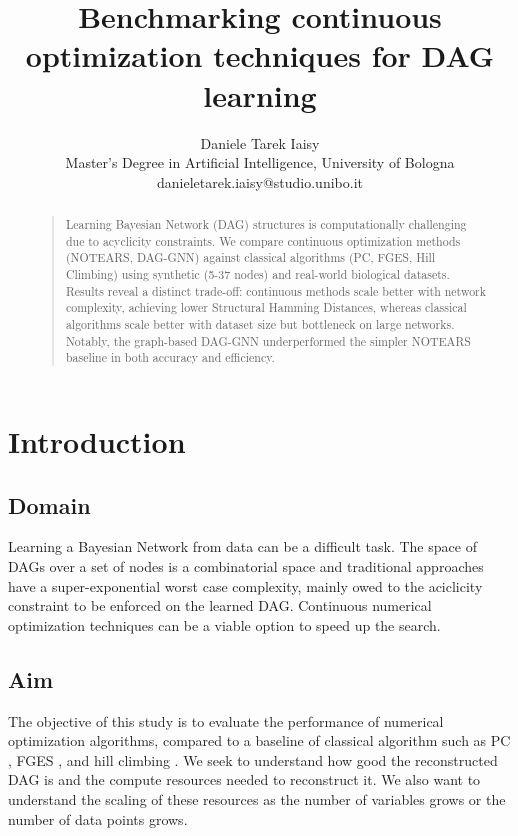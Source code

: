 \documentclass[letterpaper]{article}
\let\savedcite\cite
\let\cite\savedcite
\begin{document}
%
\title{Benchmarking continuous optimization techniques for DAG learning}
\author{Daniele Tarek Iaisy\\
Master's Degree in Artificial Intelligence, University of Bologna\\
danieletarek.iaisy@studio.unibo.it
}
\maketitle


\begin{abstract}
\begin{quote}
Learning Bayesian Network (DAG) structures is computationally challenging due to acyclicity
constraints. We compare continuous optimization methods (NOTEARS, DAG-GNN) against classical
algorithms (PC, FGES, Hill Climbing) using synthetic (5-37 nodes) and real-world biological
datasets. Results reveal a distinct trade-off: continuous methods scale better with network
complexity, achieving lower Structural Hamming Distances, whereas classical algorithms scale
better with dataset size but bottleneck on large networks. Notably, the graph-based DAG-GNN
underperformed the simpler NOTEARS baseline in both accuracy and efficiency.
\end{quote}
\end{abstract}


\section{Introduction}

\subsection{Domain}
Learning a Bayesian Network from data can be a difficult task. The space of DAGs over a set of 
nodes is a combinatorial space and traditional approaches have a super-exponential worst case
complexity, mainly owed to the aciclicity constraint to be enforced on the learned DAG.
Continuous numerical optimization techniques can be a viable option to speed up the search.

\subsection{Aim}
The objective of this study is to evaluate the performance of numerical optimization 
algorithms, compared to a baseline of classical algorithm such as PC \cite{spirtes1991pc},
FGES \cite{ramsey2017fges}, and hill climbing \cite{heckerman1995learning}.
We seek to understand how good the reconstructed DAG is and the compute resources needed to 
reconstruct it. We also want to understand the scaling of these resources as the number of 
variables grows or the number of data points grows.
\end{document}
